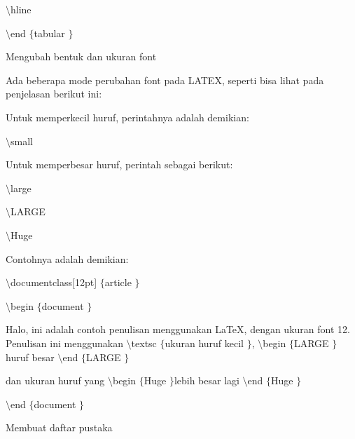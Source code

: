 \begin{itemize}
{ \par
{\fontsize{10pt}{10pt}\selectfont  $  \setminus  $hline} \par
{\fontsize{10pt}{10pt}\selectfont  $  \setminus  $end $  \{  $tabular $  \}  $} \par
\vspace{12pt}
\noindent 
\item Mengubah bentuk dan ukuran font \par
Ada beberapa mode perubahan font pada LATEX, seperti bisa lihat pada penjelasan berikut ini: 
 \par
\vspace{12pt}
Untuk memperkecil huruf, perintahnya adalah demikian: \par
 $  \setminus  $small \par
\vspace{12pt}
Untuk memperbesar huruf, perintah sebagai berikut: \par
{\fontsize{10pt}{10pt}\selectfont  $  \setminus  $large} \par
{\fontsize{10pt}{10pt}\selectfont  $  \setminus  $LARGE} \par
{\fontsize{10pt}{10pt}\selectfont  $  \setminus  $Huge} \par
\vspace{12pt}
Contohnya adalah demikian: \par
{\fontsize{10pt}{10pt}\selectfont  $  \setminus  $documentclass[12pt] $  \{  $article $  \}  $} \par
{\fontsize{10pt}{10pt}\selectfont  $  \setminus  $begin $  \{  $document $  \}  $} \par
\vspace{10pt}
{\fontsize{10pt}{10pt}\selectfont Halo, ini adalah contoh penulisan menggunakan LaTeX, dengan ukuran font 12. Penulisan ini menggunakan  $  \setminus  $textsc $  \{  $ukuran huruf kecil $  \}  $,  $  \setminus  $begin $  \{  $LARGE $  \}  $huruf besar $  \setminus  $end $  \{  $LARGE $  \}  $} \par
\vspace{10pt}
{\fontsize{10pt}{10pt}\selectfont dan ukuran huruf yang  $  \setminus  $begin $  \{  $Huge $  \}  $lebih besar lagi $  \setminus  $end $  \{  $Huge $  \}  $} \par
{\fontsize{10pt}{10pt}\selectfont  $  \setminus  $end $  \{  $document $  \}  $} \par
\vspace{10pt}
\vspace{10pt}
\noindent 
\item Membuat daftar pustaka \par
}
\end{itemize}
